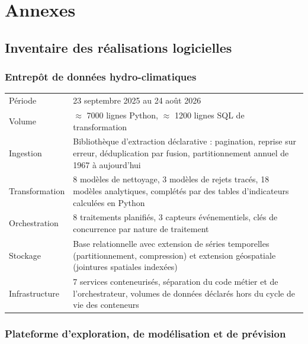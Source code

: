 \chapter{Annexes}
\label{ch:annexes}

\section{Inventaire des réalisations logicielles}

\subsection*{Entrepôt de données hydro-climatiques}

\begin{center}
\begin{tabularx}{\textwidth}{@{}lX@{}}
\toprule
Période & 23 septembre 2025 au 24 août 2026 \\
Volume & $\approx$ \num{7000} lignes Python, $\approx$ \num{1200} lignes SQL de transformation \\
Ingestion & Bibliothèque d'extraction déclarative : pagination, reprise sur erreur,
déduplication par fusion, partitionnement annuel de 1967 à aujourd'hui \\
Transformation & 8 modèles de nettoyage, 3 modèles de rejets tracés, 18 modèles analytiques,
complétés par des tables d'indicateurs calculées en Python \\
Orchestration & 8 traitements planifiés, 3 capteurs événementiels, clés de concurrence par
nature de traitement \\
Stockage & Base relationnelle avec extension de séries temporelles (partitionnement,
compression) et extension géospatiale (jointures spatiales indexées) \\
Infrastructure & 7 services conteneurisés, séparation du code métier et de l'orchestrateur,
volumes de données déclarés hors du cycle de vie des conteneurs \\
\bottomrule
\end{tabularx}
\end{center}

\subsection*{Plateforme d'exploration, de modélisation et de prévision}


